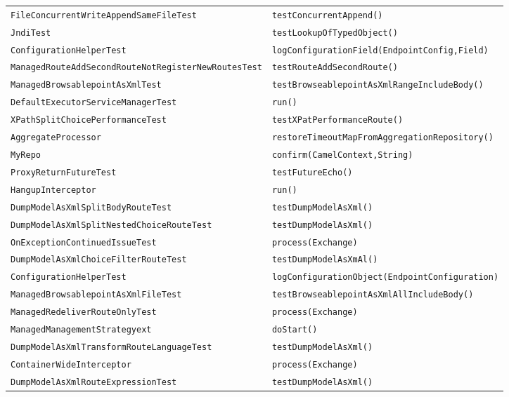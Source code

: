 \begin{center}
\begin{longtable}{ll}
\lstinline/FileConcurrentWriteAppendSameFileTest/&{\lstinline/testConcurrentAppend()/}\\
\lstinline/JndiTest/&{\lstinline/testLookupOfTypedObject()/}\\
\lstinline/ConfigurationHelperTest/&{\lstinline/logConfigurationField(EndpointConfig,Field)/}\\
\lstinline/ManagedRouteAddSecondRouteNotRegisterNewRoutesTest/&{\lstinline/testRouteAddSecondRoute()/}\\
\lstinline/ManagedBrowsablepointAsXmlTest/&{\lstinline/testBrowseablepointAsXmlRangeIncludeBody()/}\\
\lstinline/DefaultExecutorServiceManagerTest/&{\lstinline/run()/}\\
\lstinline/XPathSplitChoicePerformanceTest/&{\lstinline/testXPatPerformanceRoute()/}\\
\lstinline/AggregateProcessor/&{\lstinline/restoreTimeoutMapFromAggregationRepository()/}\\
\lstinline/MyRepo/&{\lstinline/confirm(CamelContext,String)/}\\
\lstinline/ProxyReturnFutureTest/&{\lstinline/testFutureEcho()/}\\
\lstinline/HangupInterceptor/&{\lstinline/run()/}\\
\lstinline/DumpModelAsXmlSplitBodyRouteTest/&{\lstinline/testDumpModelAsXml()/}\\
\lstinline/DumpModelAsXmlSplitNestedChoiceRouteTest/&{\lstinline/testDumpModelAsXml()/}\\
\lstinline/OnExceptionContinuedIssueTest/&{\lstinline/process(Exchange)/}\\
\lstinline/DumpModelAsXmlChoiceFilterRouteTest/&{\lstinline/testDumpModelAsXmAl()/}\\
\lstinline/ConfigurationHelperTest/&{\lstinline/logConfigurationObject(EndpointConfiguration)/}\\
\lstinline/ManagedBrowsablepointAsXmlFileTest/&{\lstinline/testBrowseablepointAsXmlAllIncludeBody()/}\\
\lstinline/ManagedRedeliverRouteOnlyTest/&{\lstinline/process(Exchange)/}\\
\lstinline/ManagedManagementStrategyext/&{\lstinline/doStart()/}\\
\lstinline/DumpModelAsXmlTransformRouteLanguageTest/&{\lstinline/testDumpModelAsXml()/}\\
\lstinline/ContainerWideInterceptor/&{\lstinline/process(Exchange)/}\\
\lstinline/DumpModelAsXmlRouteExpressionTest/&{\lstinline/testDumpModelAsXml()/}\\

\end{longtable}
\end{center}
